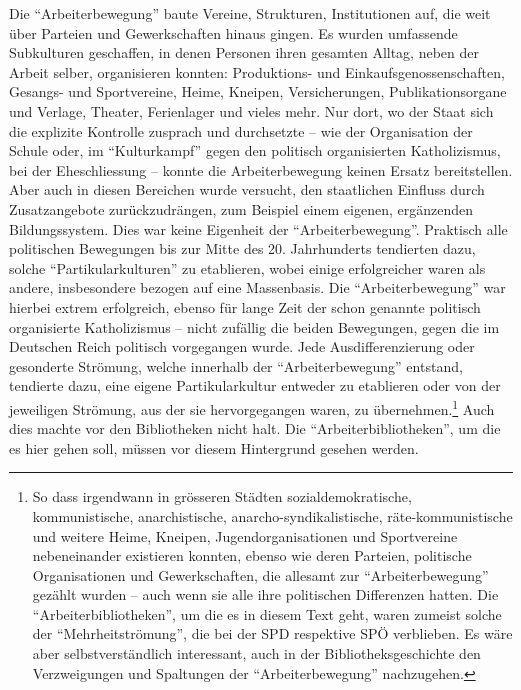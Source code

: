 \documentclass[a4paper,
fontsize=11pt,
oneside,
numbers=noperiodatend,
parskip=half-,
bibliography=totoc,
final
]{scrartcl}
\begin{document}
Die \enquote{Arbeiterbewegung} baute Vereine, Strukturen, Institutionen
auf, die weit über Parteien und Gewerkschaften hinaus gingen. Es wurden
umfassende Subkulturen geschaffen, in denen Personen ihren gesamten
Alltag, neben der Arbeit selber, organisieren konnten: Produktions- und
Einkaufsgenossenschaften, Gesangs- und Sportvereine, Heime, Kneipen,
Versicherungen, Publikationsorgane und Verlage, Theater, Ferienlager und
vieles mehr. Nur dort, wo der Staat sich die explizite Kontrolle
zusprach und durchsetzte -- wie der Organisation der Schule oder, im
\enquote{Kulturkampf} gegen den politisch organisierten Katholizismus,
bei der Eheschliessung -- konnte die Arbeiterbewegung keinen Ersatz
bereitstellen. Aber auch in diesen Bereichen wurde versucht, den
staatlichen Einfluss durch Zusatzangebote zurückzudrängen, zum Beispiel
einem eigenen, ergänzenden Bildungssystem. Dies war keine Eigenheit der
\enquote{Arbeiterbewegung}. Praktisch alle politischen Bewegungen bis
zur Mitte des 20. Jahrhunderts tendierten dazu, solche
\enquote{Partikularkulturen} zu etablieren, wobei einige erfolgreicher
waren als andere, insbesondere bezogen auf eine Massenbasis. Die
\enquote{Arbeiterbewegung} war hierbei extrem erfolgreich, ebenso für
lange Zeit der schon genannte politisch organisierte Katholizismus --
nicht zufällig die beiden Bewegungen, gegen die im Deutschen Reich
politisch vorgegangen wurde. Jede Ausdifferenzierung oder gesonderte
Strömung, welche innerhalb der \enquote{Arbeiterbewegung} entstand,
tendierte dazu, eine eigene Partikularkultur entweder zu etablieren oder
von der jeweiligen Strömung, aus der sie hervorgegangen waren, zu
übernehmen.\footnote{So dass irgendwann in grösseren Städten
  sozialdemokratische, kommunistische, anarchistische,
  anarcho-syndikalistische, räte-kommunistische und weitere Heime,
  Kneipen, Jugendorganisationen und Sportvereine nebeneinander
  existieren konnten, ebenso wie deren Parteien, politische
  Organisationen und Gewerkschaften, die allesamt zur
  \enquote{Arbeiterbewegung} gezählt wurden -- auch wenn sie alle ihre
  politischen Differenzen hatten. Die \enquote{Arbeiterbibliotheken}, um
  die es in diesem Text geht, waren zumeist solche der
  \enquote{Mehrheitströmung}, die bei der SPD respektive SPÖ verblieben.
  Es wäre aber selbstverständlich interessant, auch in der
  Bibliotheksgeschichte den Verzweigungen und Spaltungen der
  \enquote{Arbeiterbewegung} nachzugehen.} Auch dies machte vor den
Bibliotheken nicht halt. Die \enquote{Arbeiterbibliotheken}, um die es
hier gehen soll, müssen vor diesem Hintergrund gesehen werden.
\end{document}
